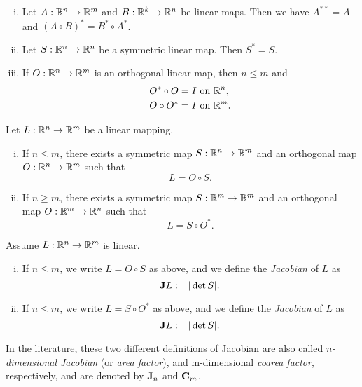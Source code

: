 \begin{proposition} \label{prop:properties_linear} \hfill
\begin{enumerate}[i)]
\item Let $A: \mathbb{R}^{n} \to \mathbb{R}^{m}$ and $B: \mathbb{R}^{k} \to \mathbb{R}^{n}$ be linear maps. Then we have $A^{**} = A$ and $(A \circ B)^{*} = B^{*} \circ A^{*}$.
\item Let $S : \mathbb{R}^{n} \to \mathbb{R}^{n}$ be a symmetric linear map. Then $S^{*} = S$.
\item If $O : \mathbb{R}^{n} \to \mathbb{R}^{m}$ is an orthogonal linear map, then $n \le m$ and 
\begin{align*}
O^{*} \circ O = I & \text{ on } \mathbb{R}^{n}, \\
O \circ O^{*} = I & \text{ on } \mathbb{R}^{m}.
\end{align*}
\end{enumerate}
\end{proposition}

\begin{theorem} \label{thm:polar_decomposition_map}
Let $L: \mathbb{R}^{n} \to \mathbb{R}^{m}$ be a linear mapping.
\begin{enumerate}[i)]
\item If $n \le m$, there exists a symmetric map $S: \mathbb{R}^{n} \to \mathbb{R}^{m}$ and an orthogonal map $O: \mathbb{R}^{n} \to \mathbb{R}^{m}$ such that $$L = O \circ S.$$
\item If $n \ge m$, there exists a symmetric map $S: \mathbb{R}^{m} \to \mathbb{R}^{m}$ and an orthogonal map $O: \mathbb{R}^{m} \to \mathbb{R}^{n}$ such that $$L = S \circ O^{*}.$$
\end{enumerate}
\end{theorem}

\begin{definition}[Jacobian]
Assume $L : \mathbb{R}^{n} \to \mathbb{R}^{m}$ is linear.
\begin{enumerate}[i)]
\item If $n \le m$, we write $L = O \circ S$ as above, and we define the {\em Jacobian} of $L$ as $${\bf J} L := |\det{S}|.$$ 
\item If $n \le m$, we write $L = S \circ O^{*}$ as above, and we define the {\em Jacobian} of $L$ as $${\bf J} L := |\det{S}|.$$ 
\end{enumerate}
\end{definition}

In the literature, these two different definitions of Jacobian are also called {\em $n$-dimensional Jacobian} (or {\em area factor}), and {m}-dimensional {\em coarea factor}, respectively, and are denoted by ${\bf J}_{n}$ and ${\bf C}_{m}$.

